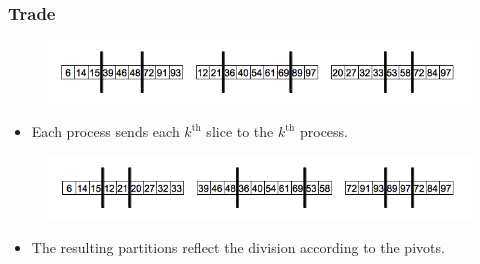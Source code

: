 \documentclass{beamer}
\begin{document}
\begin{frame}
	\frametitle{Trade}
	\begin{figure}
		\begin{center}
			\includegraphics[width=\textwidth]{images/06slices.png}
		\end{center}
	\end{figure}
	
	\pause
	\begin{itemize}
		\item{Each process sends each $k^{\mathrm{th}}$ slice to the $k^{\mathrm{th}}$ process.}
	\end{itemize}
	
	\begin{figure}
		\begin{center}
			\includegraphics[width=\textwidth]{images/07trade.png}
		\end{center}
	\end{figure}
	
	\pause
	\begin{itemize}
		\item{The resulting partitions reflect the division according to the pivots.}
	\end{itemize}
\end{frame}
\end{document}
